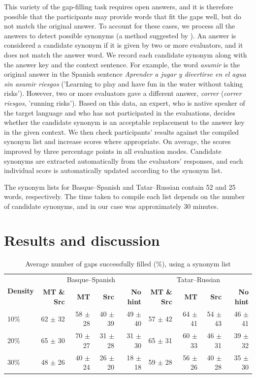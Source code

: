 \documentclass[11pt]{article}
\begin{document}
This variety of the gap-filling task requires open answers, and it is therefore possible that the participants may
provide words that fit the gaps well, but do not match the original answer. To account for
these cases, we process all the answers to detect possible synonyms (a method suggested by \cite{oregan13}). An answer is
considered a candidate synonym if it is given by two or more evaluators, and it does not match
the answer word. We record each candidate synonym along with the answer key and the
context sentence. For example, the word \emph{asumir} is the original answer in the Spanish sentence \emph{Aprender a jugar y divertirse en el agua sin asumir riesgos} ('Learning to play and have fun in the water without taking risks'). However, two or more evaluators gave a different answer, \emph{correr} (\emph{correr riesgos}, 'running risks'). Based on this data, an expert, who is native speaker of the target language and who has not participated in the evaluations, decides
whether the candidate synonym is an acceptable replacement to the answer key in the given
context. We then check participants' results against the compiled synonym list and
increase scores where appropriate. On average, the scores improved by three percentage points in all evaluation modes. Candidate synonyms are extracted automatically from the evaluators' responses,  and each individual score is automatically updated according to the synonym list.

The synonym lists for Basque--Spanish and Tatar--Russian contain 52 and 25 words, respectively. The time taken to compile each list depends on the number of candidate synonyms, and in our case was approximately 30 minutes. 

\section{Results and discussion}
\label{sec:results}
\begin{table}
\centering
  \begin{tabular}{|l|r|r|r|r|r|r|r|r|}
  \hline
 \multirow{2}{*}{\textbf{Density}} & \multicolumn{4}{|c|}{Basque--Spanish} & \multicolumn{4}{|c|}{Tatar--Russian} 
\\\cline{2-9}
                                            & \textbf{MT \& Src} & \textbf{MT} & \textbf{Src} & \textbf{No hint}& \textbf{MT \& Src} & \textbf{MT} & \textbf{Src} & \textbf{No hint} 
\\
\hline
10\%&62 \(\pm\) 32&58 \(\pm\) 28&40 \(\pm\) 39&49 \(\pm\) 40
&57 \(\pm\) 42&64 \(\pm\) 41&54 \(\pm\) 43&46 \(\pm\) 41\\
20\%&65 \(\pm\) 30&70 \(\pm\) 27&31 \(\pm\) 28&31 \(\pm\) 30
&65 \(\pm\) 31&60 \(\pm\) 33&46 \(\pm\) 31&39 \(\pm\) 32\\
30\%&48 \(\pm\) 26&40 \(\pm\) 24&26 \(\pm\) 20&18 \(\pm\) 18
&59 \(\pm\) 28&56 \(\pm\) 26&40 \(\pm\) 28&35 \(\pm\) 30\\
\hline
\end{tabular}
\caption{Average number of gaps successfully filled (\%), using a synonym list} 
\label{table:res}
\end{table}
\end{document}
